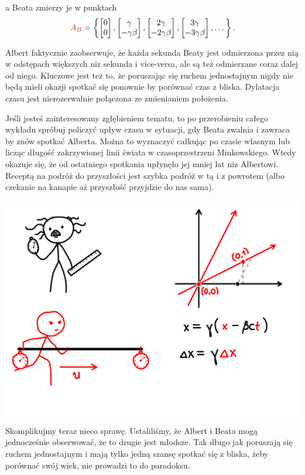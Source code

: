 \documentclass[10pt,twocolumn,fleqn,polish]{article}
\providecommand{\mathcolor}[2]{{\color{#1}#2}}
\newcommand{\mred}[1]{\mathcolor{BrickRed}{#1}}
\begin{document}
a Beata zmierzy je w punktach
\[
  \mred{A_B} = \left\{
  \begin{bmatrix} 0 \\ 0 \end{bmatrix},
  \begin{bmatrix} \gamma \\ -\gamma\beta \end{bmatrix},
  \begin{bmatrix} 2\gamma \\ -2\gamma\beta \end{bmatrix},
  \begin{bmatrix} 3\gamma \\ -3\gamma\beta \end{bmatrix},
  \dots
  \right\}.
\]

Albert faktycznie zaobserwuje, że każda sekunda Beaty jest odmierzona przez nią
w odstępach większych niz sekunda i vice-versa, ale są też odmierzane
coraz dalej od niego. Kluczowe jest też to, że poruszając się ruchem jednostajnym
nigdy nie będą mieli okazji spotkać się ponownie by porównać czas z bliska.
Dylatacja czasu jest nierozerwalnie połączona ze zmienianiem położenia.

Jeśli jesteś zainteresowany zgłębieniem tematu, to po przerobieniu całego
wykładu spróbuj policzyć upływ czasu w sytuacji, gdy Beata zwalnia i zawraca
by znów spotkać Alberta. Można to wyznaczyć całkując po czasie własnym lub
licząc długość zakrzywionej linii świata w czasoprzestrzeni Minkowskiego.
Wtedy okazuje się, że od ostatniego spotkania upłynęło jej mniej lat niz Albertowi.
Receptą na podróż do przyszłości jest szybka podróż w tą i z powrotem
(albo czekanie na kanapie aż przyszłość przyjdzie do nas sama).
\newpage

\noindent\includegraphics[width=1\linewidth]{pages/STA-page26}
Skomplikujmy teraz nieco sprawę. Ustaliliśmy, że Albert i Beata mogą jednocześnie
obserwować, że to drugie jest młodsze. Tak długo jak poruszają się ruchem
jednostajnym i mają tylko jedną szansę spotkać się z bliska, żeby porównać
swój wiek, nie prowadzi to do paradoksu.
\end{document}
